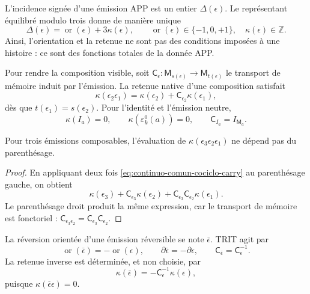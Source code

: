 L'incidence signée d'une émission APP est un entier \(\Delta(\epsilon)\). Le représentant équilibré modulo trois donne de manière unique
\begin{equation}
\label{eq:continuo-comun-trit-euclid}
 \Delta(\epsilon)
 =\operatorname{or}(\epsilon)+3\kappa(\epsilon),
 \qquad
 \operatorname{or}(\epsilon)\in\{-1,0,+1\},
 \quad
 \kappa(\epsilon)\in\mathbb Z.
\end{equation}
Ainsi, l'orientation et la retenue ne sont pas des conditions imposées à une histoire : ce sont des fonctions totales de la donnée APP.

Pour rendre la composition visible, soit \(\mathsf C_{\epsilon}:\mathsf M_{s(\epsilon)}\to
\mathsf M_{t(\epsilon)}\) le transport de mémoire induit par l'émission. La retenue native d'une composition satisfait
\begin{equation}
\label{eq:continuo-comun-cociclo-carry}
 \kappa(\epsilon_2\epsilon_1)
 =\kappa(\epsilon_2)
  +\mathsf C_{\epsilon_2}\kappa(\epsilon_1),
\end{equation}
dès que \(t(\epsilon_1)=s(\epsilon_2)\). Pour l'identité et l'émission neutre,
\begin{equation}
\label{eq:continuo-comun-carry-unidad}
 \kappa(I_a)=0,
 \qquad
 \kappa(\varepsilon^0_k(a))=0,
 \qquad
 \mathsf C_{I_a}=I_{\mathsf M_a}.
\end{equation}

\begin{lemma}
\label{lem:continuo-comun-asociatividad-carry}
Pour trois émissions composables, l'évaluation de \(\kappa(\epsilon_3\epsilon_2\epsilon_1)\) ne dépend pas du parenthésage.
\end{lemma}

\begin{proof}
En appliquant deux fois \eqref{eq:continuo-comun-cociclo-carry} au parenthésage gauche, on obtient
\[
 \kappa(\epsilon_3)
 +\mathsf C_{\epsilon_3}\kappa(\epsilon_2)
 +\mathsf C_{\epsilon_3}\mathsf C_{\epsilon_2}
  \kappa(\epsilon_1).
\]
Le parenthésage droit produit la même expression, car le transport de mémoire est fonctoriel : \(\mathsf C_{\epsilon_3\epsilon_2}
=\mathsf C_{\epsilon_3}\mathsf C_{\epsilon_2}\).
\end{proof}

La réversion orientée d'une émission réversible se note \(\overline\epsilon\). TRIT agit par
\begin{equation}
\label{eq:continuo-comun-reversion-trit}
 \operatorname{or}(\overline\epsilon)
 =-\operatorname{or}(\epsilon),
 \qquad
 \partial\overline\epsilon=-\partial\epsilon,
 \qquad
 \mathsf C_{\overline\epsilon}=\mathsf C_\epsilon^{-1}.
\end{equation}
La retenue inverse est déterminée, et non choisie, par
\begin{equation}
\label{eq:continuo-comun-carry-inverso}
 \kappa(\overline\epsilon)
 =-\mathsf C_\epsilon^{-1}\kappa(\epsilon),
\end{equation}
puisque \(\kappa(\overline\epsilon\epsilon)=0\).


